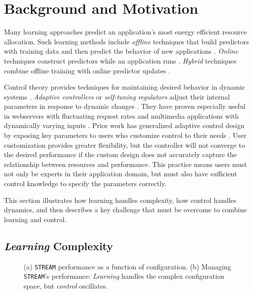 \section{Background and Motivation}
\label{sec:example}
Many learning approaches predict an application's most energy
efficient resource allocation.  Such learning methods include
\emph{offline} techniques that build predictors with training data and
then predict the behavior of new applications
\cite{Yi2003,LeeBrooks2006,CPR,reddiHPCA2013,PUPiL,quasar}.
\emph{Online} techniques construct predictors while an application
runs \cite{Li2006,Flicker,ParallelismDial,Ponamarev,LeeBrooks}.
\emph{Hybrid} techniques combine offline training with online
predictor updates \cite{packandcap,Winter2010,dubach2010,Koala,Cinder,
  wu2012inferred,LEO}.

Control theory provides techniques for maintaining desired behavior in
dynamic systems \cite{Hellerstein2004a}. \emph{Adaptive controllers}
or \emph{self-tuning regulators} adjust their internal parameters in
response to dynamic changes \cite{HandbookControl}. They have proven
especially useful in webservers with fluctuating request rates
\cite{Horvarth,LuEtAl-2006a,SunDaiPan-2008a} and multimedia
applications with dynamically varying inputs
\cite{TCST,Agilos,grace2}.  Prior work has generalized adaptive
control design by exposing key parameters to users who customize
control to their needs \cite{ControlWare,POET}.  User customization
provides greater flexibility, but the controller will not converge to
the desired performance if the custom design does not accurately
capture the relationship between resources and performance.  This
practice means users must not only be experts in their application
domain, but must also have sufficient control knowledge to specify the
parameters correctly.

This section illustrates how learning handles complexity, how control
handles dynamics, and then describes a key challenge that must be
overcome to combine learning and control.

\subsection{\emph{Learning} Complexity}
\begin{figure}
\centering
  \subfloat[]
  {
    
    \label{fig:STREAM_timeline}
  }
  \caption{(a) \texttt{STREAM} performance as a function of
    configuration.  (b) Managing \texttt{STREAM}'s performance:
    \emph{Learning} handles the complex configuration space, but
    \emph{control} oscillates.}
  \label{fig:learning-models1}
\end{figure}

